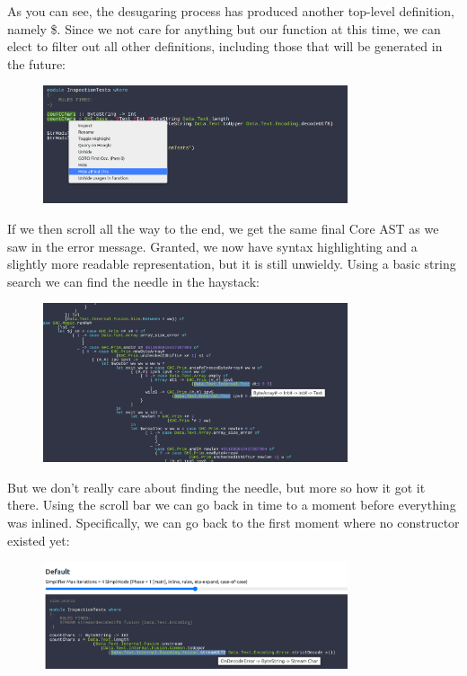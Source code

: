 As you can see, the desugaring process has produced another top-level definition, namely \$. Since we
not care for anything but our  function at this time, we can elect to filter out all other definitions,
including those that will be generated in the future: 

\begin{figure}[H]
\centering
\includegraphics[width=0.8\textwidth]{figs/countchars_hideallbut.png}
\label{fig:countchars_3}
\end{figure}

If we then scroll all the way to the end, we get the same final Core AST as we saw in the error message. Granted,
we now have syntax highlighting and a slightly more readable representation, but it is still unwieldy. Using a basic string search we can find the needle in the haystack:

\begin{figure}[H]
\centering
\includegraphics[width=0.8\textwidth]{figs/countchars_3.png}
\end{figure}

But we don't really care about finding the needle, but more so how it got it there.
Using the scroll bar we can go back in time to a moment before everything was inlined.
Specifically, we can go back to the first moment where no  constructor existed yet:

\begin{figure}[H]
\centering
\includegraphics[width=0.8\textwidth]{figs/countchars_4.png}
\end{figure}

